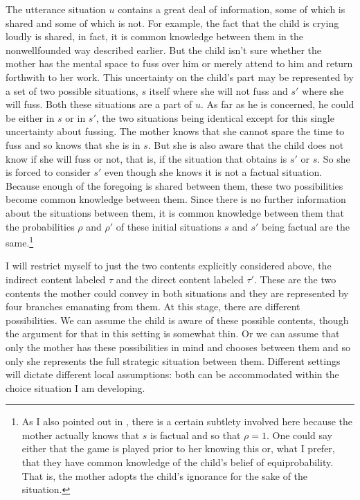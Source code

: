 The utterance situation $u$ contains a great deal of information, some of which is shared and some of which is not. For example, the fact that the child is crying loudly is shared, in fact, it is common knowledge between them in the nonwellfounded way described earlier. But the child isn't sure whether the mother has the mental space to fuss over him or merely attend to him and return forthwith to her work. This uncertainty on the child's part may be represented by a set of two possible situations, $s$ itself where she will not fuss and $s'$ where she will fuss. Both these situations are a part of $u$. As far as he is concerned, he could be either in $s$ or in $s'$, the two situations being identical except for this single uncertainty about fussing. The mother knows that she cannot spare the time to fuss and so knows that she is in $s$. But she is also aware that the child does not know if she will fuss or not, that is, if the situation that obtains is $s'$ or $s$. So she is forced to consider $s'$ even though she knows it is not a factual situation. Because enough of the foregoing is shared between them, these two possibilities become common knowledge between them. Since there is no further information about the situations between them, it is common knowledge between them that the probabilities $\rho$ and $\rho'$ of these initial situations $s$ and $s'$ being factual are the same.\footnote{As I also pointed out in , there is a certain subtlety involved here because the mother actually knows that $s$ is factual and so that $\rho = 1$. One could say either that the game is played prior to her knowing this or, what I prefer, that they have common knowledge of the child's belief of equiprobability. That is, the mother adopts the child's ignorance for the sake of the situation.}

I will restrict myself to just the two contents explicitly considered above, the indirect content labeled $\tau$ and the direct content labeled $\tau'$. These are the two contents the mother could convey in both situations and they are represented by four branches emanating from them. At this stage, there are different possibilities. We can assume the child is aware of these possible contents, though the argument for that in this setting is somewhat thin. Or we can assume that only the mother has these possibilities in mind and chooses between them and so only she represents the full strategic situation between them. Different settings will dictate different local assumptions: both can be accommodated within the choice situation I am developing. 

